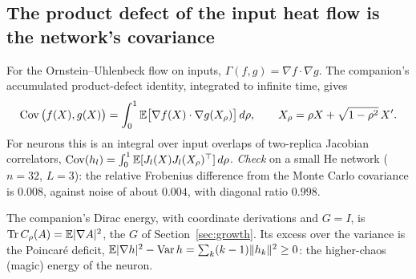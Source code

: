 \label{sec:gamma}
\subsection{The product defect of the input heat flow is the network's covariance}
For the Ornstein--Uhlenbeck flow on inputs, $\Gamma(f,g)=\nabla f\cdot\nabla g$. The companion's accumulated product-defect identity, integrated to infinite
time, gives
\[
\operatorname{Cov}\big(f(X),g(X)\big)=\int_0^1\mathbb E\big[\nabla f(X)\cdot\nabla g(X_\rho)\big]\,d\rho,\qquad X_\rho=\rho X+\sqrt{1-\rho^2}\,X'.
\]
For neurons this is an integral over input overlaps of two-replica Jacobian correlators, $\operatorname{Cov}(h_l)=\int_0^1\mathbb E[J_l(X)J_l(X_\rho)^\top]\,d\rho$.
\emph{Check} on a small He network ($n=32$, $L=3$): the relative Frobenius difference from the Monte Carlo covariance is $0.008$, against
noise of about $0.004$, with diagonal ratio $0.998$.

The companion's Dirac energy, with coordinate derivations and $G=I$, is $\operatorname{Tr} C_\rho(A)=\mathbb E|\nabla A|^2$, the $G$ of Section~\ref{sec:growth}. Its excess over the
variance is the Poincaré deficit, $\mathbb E|\nabla h|^2-\operatorname{Var} h=\sum_k(k-1)\|h_k\|^2\ge0$: the higher-chaos (magic) energy of the neuron.

